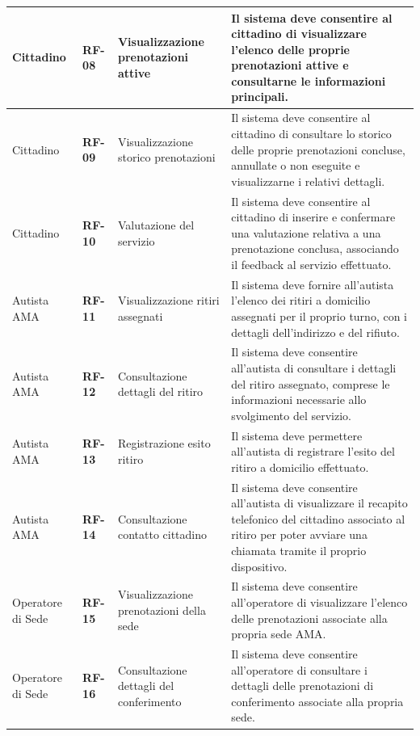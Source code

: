 \begin{center}
\begin{longtable}{|p{2.8cm}|p{1.2cm}|p{3.8cm}|p{6.2cm}|}
Cittadino & \textbf{RF-08} & Visualizzazione prenotazioni attive & Il sistema deve consentire al cittadino di visualizzare l'elenco delle proprie prenotazioni attive e consultarne le informazioni principali. \\ \hline

Cittadino & \textbf{RF-09} & Visualizzazione storico prenotazioni & Il sistema deve consentire al cittadino di consultare lo storico delle proprie prenotazioni concluse, annullate o non eseguite e visualizzarne i relativi dettagli. \\ \hline

Cittadino & \textbf{RF-10} & Valutazione del servizio & Il sistema deve consentire al cittadino di inserire e confermare una valutazione relativa a una prenotazione conclusa, associando il feedback al servizio effettuato. \\ \hline

Autista AMA & \textbf{RF-11} & Visualizzazione ritiri assegnati & Il sistema deve fornire all'autista l'elenco dei ritiri a domicilio assegnati per il proprio turno, con i dettagli dell'indirizzo e del rifiuto. \\ \hline

Autista AMA & \textbf{RF-12} & Consultazione dettagli del ritiro & Il sistema deve consentire all'autista di consultare i dettagli del ritiro assegnato, comprese le informazioni necessarie allo svolgimento del servizio. \\ \hline

Autista AMA & \textbf{RF-13} & Registrazione esito ritiro & Il sistema deve permettere all'autista di registrare l'esito del ritiro a domicilio effettuato. \\ \hline

Autista AMA & \textbf{RF-14} & Consultazione contatto cittadino & Il sistema deve consentire all'autista di visualizzare il recapito telefonico del cittadino associato al ritiro per poter avviare una chiamata tramite il proprio dispositivo. \\ \hline

Operatore di Sede & \textbf{RF-15} & Visualizzazione prenotazioni della sede & Il sistema deve consentire all'operatore di visualizzare l'elenco delle prenotazioni associate alla propria sede AMA. \\ \hline

Operatore di Sede & \textbf{RF-16} & Consultazione dettagli del conferimento & Il sistema deve consentire all'operatore di consultare i dettagli delle prenotazioni di conferimento associate alla propria sede. \\ \hline


\end{longtable}
\end{center}
